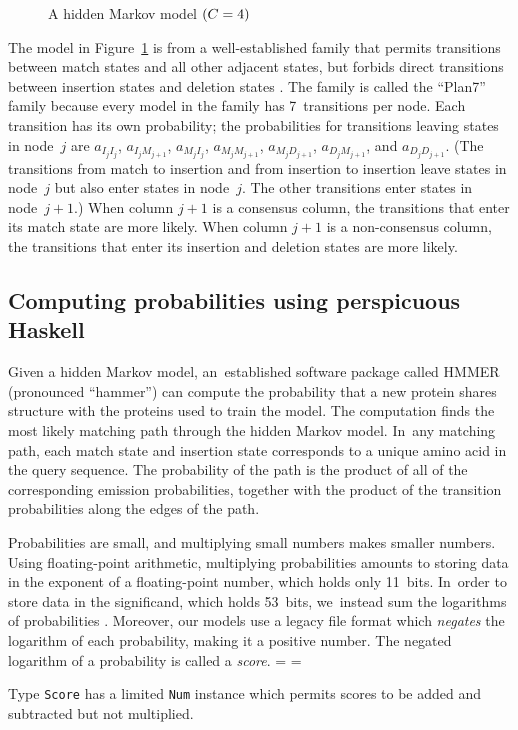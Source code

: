 \documentclass[]{jfp1}
\newcommand\txprobxj[3][]{a#1_{{#2}_{j}{#3}_{j+1}}}  %
\newcommand\txprobjj[3][]{a#1_{{#2}_{j}{#3}_j}} %
\newcommand\alignwidth{\ensuremath C} %
\newcommand\figref[1]{Figure~\ref{fig:#1}}
\newcommand\figlabel[1]{\label{fig:#1}}
\newcommand\seclabel[1]{\label{sec:#1}}
\newif\ifverbatimsmall
\newcommand\smallverbatiminput[1]{%
  \verbatimsmalltrue
  \presvtopsep=\topsep
  \topsep=0.78\topsep
  \verbatimsmallfalse
  \topsep=\presvtopsep
}
\let\cite\citep
\begin{document}
\begin{figure} 
\centerline{} 

\caption{A hidden Markov model $(\alignwidth = 4)$}

\figlabel{plan7}
\end{figure}

The model in \figref{plan7} is from a well-established family
that permits
transitions between match states and all other adjacent states,
but forbids
direct
transitions between insertion 
states and deletion states  \cite{Eddy:1998ut}. 
The family is called the ``Plan7'' family because
every model in the family has 7~transitions per node.
Each transition has its own probability; the probabilities for
transitions leaving states in node~$j$ are
$\txprobjj I I$,
$\txprobxj I M$,
$\txprobjj M I$,
$\txprobxj M M$,
$\txprobxj M D$,
$\txprobxj D M$,
and
$\txprobxj D D$.
(The transitions from match to insertion and from insertion to
insertion leave states in 
node~$j$ but also enter states in node~$j$.
The other transitions enter states in node~$j+1$.)
When column $j+1$ is a consensus column, the transitions that enter
its match state 
are more likely.
When column $j+1$ is a non-consensus column, the transitions that enter
its insertion and deletion states are more likely.








\subsection{Computing probabilities using perspicuous Haskell}

\seclabel{viterbi}


Given a hidden Markov model, 
an~established software package called HMMER (pronounced ``hammer'') 
can compute the probability
that a new protein shares structure 
with the proteins used to train the model.
The computation finds the most likely matching path through the hidden Markov model.
In~any matching path, each match state and insertion state corresponds to a
unique amino acid in the query sequence.
The probability of the path is the product of all of the corresponding
emission probabilities, together with the product of the transition
probabilities along the edges of the path.

Probabilities are small, and multiplying small numbers makes smaller
numbers.
Using floating-point arithmetic, multiplying probabilities amounts to
storing data in the exponent of a floating-point number, which holds
only 11~bits.
In~order to store data in the significand, which holds 53~bits,
we~instead sum the logarithms of probabilities \cite{Viterbi:1967hq}.
Moreover, 
 our models use a
legacy file format which
\emph{negates}
the logarithm of each probability, making it a positive number.
The negated logarithm of a probability is called a \emph{score}.
\smallverbatiminput{score}
Type \texttt{Score} has a limited \texttt{Num} instance which permits
scores to be added and subtracted but not multiplied.
\end{document}
